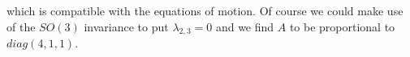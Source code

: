 \documentclass[a4paper,12pt]{article}
\begin{document}
which is compatible with the equations of motion.
Of course we could make use of the $SO(3)$ invariance to put $\lambda_{2,3}=0$
and we find $A$ to be proportional to $diag(4,1,1)$.
%
%
\end{document}
